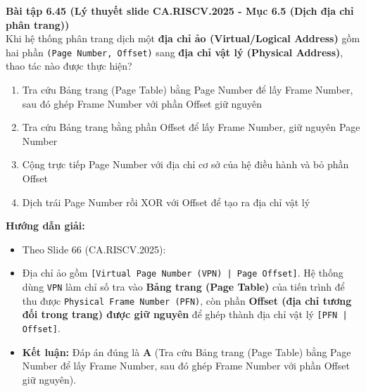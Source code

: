\textbf{Bài tập 6.45 (Lý thuyết slide CA.RISCV.2025 - Mục 6.5 (Dịch địa chỉ phân trang))}\\
Khi hệ thống phân trang dịch một \textbf{địa chỉ ảo (Virtual/Logical Address)} gồm hai phần \texttt{(Page Number, Offset)} sang \textbf{địa chỉ vật lý (Physical Address)}, thao tác nào được thực hiện?
\begin{enumerate}[label=\Alph*.]
    \item Tra cứu Bảng trang (Page Table) bằng Page Number để lấy Frame Number, sau đó ghép Frame Number với phần Offset giữ nguyên
    \item Tra cứu Bảng trang bằng phần Offset để lấy Frame Number, giữ nguyên Page Number
    \item Cộng trực tiếp Page Number với địa chỉ cơ sở của hệ điều hành và bỏ phần Offset
    \item Dịch trái Page Number rồi XOR với Offset để tạo ra địa chỉ vật lý
\end{enumerate}
\textbf{Hướng dẫn giải:}
\begin{itemize}
    \item Theo Slide 66 (CA.RISCV.2025):
    \item Địa chỉ ảo gồm \texttt{[Virtual Page Number (VPN) | Page Offset]}. Hệ thống dùng \texttt{VPN} làm chỉ số tra vào \textbf{Bảng trang (Page Table)} của tiến trình để thu được \texttt{Physical Frame Number (PFN)}, còn phần \textbf{Offset (địa chỉ tương đối trong trang) được giữ nguyên} để ghép thành địa chỉ vật lý \texttt{[PFN | Offset]}.
    \item \textbf{Kết luận:} Đáp án đúng là \textbf{A} (Tra cứu Bảng trang (Page Table) bằng Page Number để lấy Frame Number, sau đó ghép Frame Number với phần Offset giữ nguyên).
\end{itemize}

